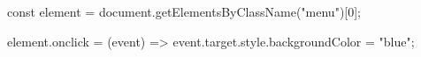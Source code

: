 const element = document.getElementsByClassName("menu")[0];

element.onclick = (event) => {
    event.target.style.backgroundColor = "blue";
}


